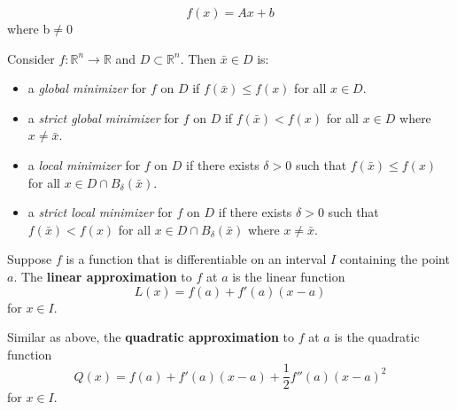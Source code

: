 \begin{definition}[affine]
\begin{equation}
    f(x) = Ax + b
\end{equation}
where b$\neq$0

\end{definition}
\begin{definition}
    Consider \(f : \mathbb{R}^n \rightarrow \mathbb{R}\) and \(D \subset \mathbb{R}^n\). Then \(\bar{x} \in D\) is:

\begin{itemize}
    \item a \textit{global minimizer} for \(f\) on \(D\) if \(f(\bar{x}) \leq f(x)\) for all \(x \in D\).
    \item a \textit{strict global minimizer} for \(f\) on \(D\) if \(f(\bar{x}) < f(x)\) for all \(x \in D\) where \(x \neq \bar{x}\).
    \item a \textit{local minimizer} for \(f\) on \(D\) if there exists \(\delta > 0\) such that \(f(\bar{x}) \leq f(x)\) for all \(x \in D \cap B_\delta(\bar{x})\).
    \item a \textit{strict local minimizer} for \(f\) on \(D\) if there exists \(\delta > 0\) such that \(f(\bar{x}) < f(x)\) for all \(x \in D \cap B_\delta(\bar{x})\) where \(x \neq \bar{x}\).
\end{itemize}
\end{definition}
\begin{definition}
    Suppose $f$ is a function that is differentiable on an interval $I$ containing the point $a$. The \textbf{linear approximation} to $f$ at $a$ is the linear function $$L(x) = f(a) + f'(a)(x-a)$$ for $x \in I$.
\end{definition}
\begin{definition}
    Similar as above, the \textbf{quadratic approximation} to $f$ at $a$ is the quadratic function $$Q(x) = f(a) + f'(a)(x-a) + \frac{1}{2}f''(a)(x-a)^2$$ for $x \in I$.
\end{definition}

% 

